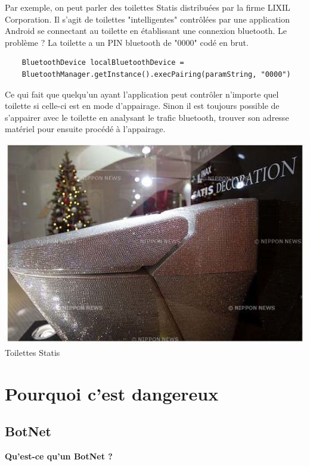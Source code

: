\documentclass[a4paper]{report}
\begin{document}
	Par exemple, on peut parler des toilettes Statis distribuées par la firme LIXIL Corporation. Il s'agit de toilettes "intelligentes" contrôlées par une application Android se connectant au toilette en établissant une connexion bluetooth. Le problème ? La toilette a un PIN bluetooth de "0000" codé en brut.
	\begin{verbatim}
	BluetoothDevice localBluetoothDevice = 
	BluetoothManager.getInstance().execPairing(paramString, "0000")
	\end{verbatim}
	Ce qui fait que quelqu'un ayant l'application peut contrôler n'importe quel toilette si celle-ci est en mode d'appairage. Sinon il est toujours possible de s'appairer avec le toilette en analysant le trafic bluetooth, trouver son adresse matériel pour ensuite procédé à l'appairage.
	
	\begin{center}
		\includegraphics[scale=0.75]{Images/statisToilet.jpg}
		Toilettes Statis
	\end{center}
	
	\newpage
	
	\section{Pourquoi c'est dangereux}
	\subsection{BotNet}
	
	\bigbreak	
	
	\begin{flushleft}
		\textbf{Qu'est-ce qu'un BotNet ?} \\
	\end{flushleft}
	
\end{document}
